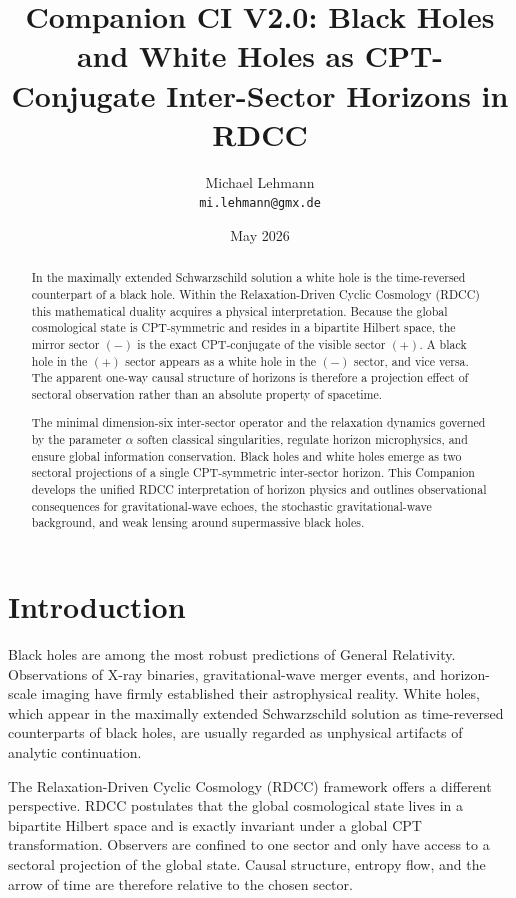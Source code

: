 \documentclass[11pt,a4paper]{article}
\title{\textbf{Companion CI V2.0: Black Holes and White Holes as CPT-Conjugate Inter-Sector Horizons in RDCC}}
\author{Michael Lehmann \\ \texttt{mi.lehmann@gmx.de}}
\date{May 2026}
\begin{document}
\maketitle

\begin{abstract}
In the maximally extended Schwarzschild solution a white hole is the time-reversed counterpart of a black hole. Within the Relaxation-Driven Cyclic Cosmology (RDCC) this mathematical duality acquires a physical interpretation. Because the global cosmological state is CPT-symmetric and resides in a bipartite Hilbert space, the mirror sector $(-)$ is the exact CPT-conjugate of the visible sector $(+)$. A black hole in the $(+)$ sector appears as a white hole in the $(-)$ sector, and vice versa. The apparent one-way causal structure of horizons is therefore a projection effect of sectoral observation rather than an absolute property of spacetime.

The minimal dimension-six inter-sector operator and the relaxation dynamics governed by the parameter $\alpha$ soften classical singularities, regulate horizon microphysics, and ensure global information conservation. Black holes and white holes emerge as two sectoral projections of a single CPT-symmetric inter-sector horizon. This Companion develops the unified RDCC interpretation of horizon physics and outlines observational consequences for gravitational-wave echoes, the stochastic gravitational-wave background, and weak lensing around supermassive black holes.
\end{abstract}


\section{Introduction}

Black holes are among the most robust predictions of General Relativity. Observations of X-ray binaries, gravitational-wave merger events, and horizon-scale imaging have firmly established their astrophysical reality. White holes, which appear in the maximally extended Schwarzschild solution as time-reversed counterparts of black holes, are usually regarded as unphysical artifacts of analytic continuation.

The Relaxation-Driven Cyclic Cosmology (RDCC) framework offers a different perspective. RDCC postulates that the global cosmological state lives in a bipartite Hilbert space and is exactly invariant under a global CPT transformation. Observers are confined to one sector and only have access to a sectoral projection of the global state. Causal structure, entropy flow, and the arrow of time are therefore relative to the chosen sector.
\end{document}
